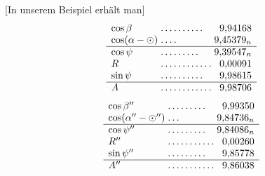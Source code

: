 [In unserem Beispiel erhält man]
\[
\begin{array}{l@{\;}l@{\;}r}
\cos\beta&\mathord{.}\,\mathord{.}\,\mathord{.}\,\mathord{.}\,\mathord{.}\,\mathord{.}\,\mathord{.}\,\mathord{.}\,\mathord{.}\,\mathord{.}&9{,}94168\\
\cos(\alpha-\odot)&\mathord{.}\,\mathord{.}\,\mathord{.}\,\mathord{.}&9{,}45379_n\\\hline
\cos\psi&\mathord{.}\,\mathord{.}\,\mathord{.}\,\mathord{.}\,\mathord{.}\,\mathord{.}\,\mathord{.}\,\mathord{.}\,\mathord{.}&9{,}39547_n\\
R&\mathord{.}\,\mathord{.}\,\mathord{.}\,\mathord{.}\,\mathord{.}\,\mathord{.}\,\mathord{.}\,\mathord{.}\,\mathord{.}\,\mathord{.}\,\mathord{.}\,\mathord{.}&0{,}00091\\
\sin\psi&\mathord{.}\,\mathord{.}\,\mathord{.}\,\mathord{.}\,\mathord{.}\,\mathord{.}\,\mathord{.}\,\mathord{.}\,\mathord{.}\,\mathord{.}&9{,}98615\\\hline
A&\mathord{.}\,\mathord{.}\,\mathord{.}\,\mathord{.}\,\mathord{.}\,\mathord{.}\,\mathord{.}\,\mathord{.}\,\mathord{.}\,\mathord{.}\,\mathord{.}\,\mathord{.}&9{,}98706
\end{array}
\]
\[
\begin{array}{l@{\;}l@{\;}r}
\cos\beta''&\mathord{.}\,\mathord{.}\,\mathord{.}\,\mathord{.}\,\mathord{.}\,\mathord{.}\,\mathord{.}\,\mathord{.}\,\mathord{.}&9{,}99350\\
\cos(\alpha''-\odot'')&\mathord{.}\,\mathord{.}\,\mathord{.}&9{,}84736_n\\\hline
\cos\psi''&\mathord{.}\,\mathord{.}\,\mathord{.}\,\mathord{.}\,\mathord{.}\,\mathord{.}\,\mathord{.}\,\mathord{.}\,\mathord{.}&9{,}84086_n\\
R''&\mathord{.}\,\mathord{.}\,\mathord{.}\,\mathord{.}\,\mathord{.}\,\mathord{.}\,\mathord{.}\,\mathord{.}\,\mathord{.}\,\mathord{.}\,\mathord{.}&0{,}00260\\
\sin\psi''&\mathord{.}\,\mathord{.}\,\mathord{.}\,\mathord{.}\,\mathord{.}\,\mathord{.}\,\mathord{.}\,\mathord{.}\,\mathord{.}&9{,}85778\\\hline
A''&\mathord{.}\,\mathord{.}\,\mathord{.}\,\mathord{.}\,\mathord{.}\,\mathord{.}\,\mathord{.}\,\mathord{.}\,\mathord{.}\,\mathord{.}\,\mathord{.}&9{,}86038
\end{array}
\]
